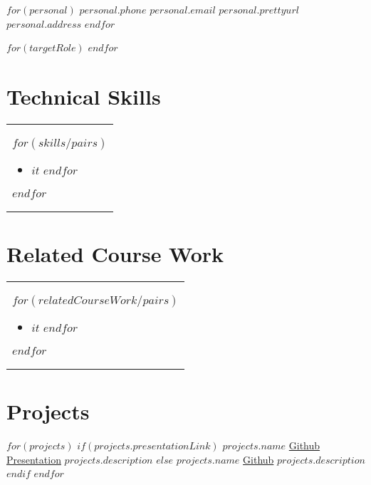\documentclass[10pt, a4paper]{article}
\begin{document}
$for(personal)$
    {$personal.phone$}
    {$personal.email$}
    {\href{$personal.website$}{$personal.prettyurl$}}
    {$personal.address$}
$endfor$

$for(targetRole)$
$endfor$

\vspace{-.3cm}

\section*{Technical Skills}
\begin{tabular}[t]{ @{}p{\textwidth} } %
  $for(skills/pairs)$ %
    \begin{minipage}[t]{.35\textwidth}
      \begin{itemize}[itemsep=-3pt,leftmargin=*]
        $for(it.value)$ %
          \item{$it$}
        $endfor$
      \end{itemize}
    \end{minipage}
  $endfor$
\end{tabular}

\vspace{-.3cm} %

\section*{Related Course Work}
\begin{tabular}[t]{ @{}p{\textwidth} } %
  $for(relatedCourseWork/pairs)$
    \begin{minipage}[t]{.35\textwidth}
      \begin{itemize}[itemsep=-3pt,leftmargin=*]
        $for(it.value)$ %
          \item{$it$}
        $endfor$
      \end{itemize}
    \end{minipage}
  $endfor$
\end{tabular}

\vspace{-.3cm} %

\section*{Projects}
  \resumeSubHeadingListStart
      $for(projects)$
        $if(projects.presentationLink)$ %
        \makeProjectRowPres
          {$projects.name$}
            {\href{$projects.githubLink$}{Github}}
            {\href{$projects.presentationLink$}{Presentation}}
          {$projects.description$}
        $else$
        \makeProjectRowNoPres
          {$projects.name$}
            {\href{$projects.githubLink$}{Github}}
          {$projects.description$}
        $endif$
      $endfor$
  \resumeSubHeadingListEnd
  
\end{document}
